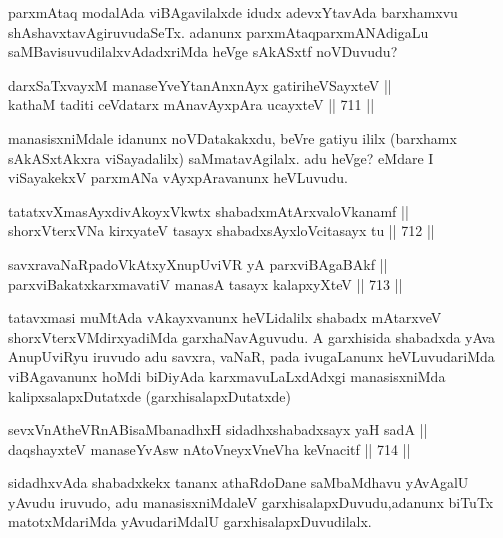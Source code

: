 \begin{artha} 
parxmAtaq modalAda viBAgavilalxde idudx adevxYtavAda barxhamxvu 
shAshavxtavAgiruvudaSeTx. adanunx parxmAtaqparxmANAdigaLu 
saMBavisuvudilalxvAdadxriMda heVge sAkASxtf noVDuvudu?
\end{artha}


\begin{shl}
darxSaTxvayxM manaseYveYtanAnxnAyx gatiriheVSayxteV || \\
kathaM taditi ceVdatarx mAnavAyxpAra ucayxteV \hfill || 711 ||  
\end{shl}

\begin{artha} 
manasisxniMdale idanunx noVDatakakxdu, beVre gatiyu ililx (barxhamx sAkASxtAkxra viSayadalilx) saMmatavAgilalx. adu heVge? eMdare I viSayakekxV parxmANa vAyxpAravanunx heVLuvudu.
\end{artha}

\begin{shl}
tatatxvXmasAyxdivAkoyxVkwtx shabadxmAtArxvaloVkanamf || \\
shorxVterxVNa kirxyateV tasayx shabadxsAyx\s \s loVcitasayx tu \hfill || 712 ||  
\end{shl}
				
\begin{shl}
savxravaNaRpadoVkAtxyX\s \s nupUviVR yA parxviBAgaBAkf || \\
parxviBakatxkarxmavatiV manasA tasayx kalapxyXteV \hfill || 713 ||  
\end{shl}

\begin{artha} 
tatavxmasi muMtAda vAkayxvanunx heVLidalilx shabadx mAtarxveV\break
shorxVterxVMdirxyadiMda garxhaNavAguvudu. A garxhisida shabadxda yAva 
AnupUviRyu iruvudo adu savxra, vaNaR, pada ivugaLanunx heVLuvudariMda 
viBAgavanunx hoMdi biDiyAda karxmavuLaLxdAdxgi manasisxniMda 
kalipxsalapxDutatxde (garxhisalapxDutatxde)
\end{artha}

\begin{shl}
sevxVnAtheVRnABisaMbanadhxH sidadhxshabadxsayx yaH sadA || \\
daqshayxteV manaseYvAsw nAtoV\s neyxVneVha keVnacitf \hfill || 714 ||  
\end{shl}

\begin{artha} 
sidadhxvAda shabadxkekx tananx athaRdoDane saMbaMdhavu yAvAgalU yAvudu 
iruvudo, adu manasisxniMdaleV garxhisalapxDuvudu,\break adanunx biTuTx 
matotxMdariMda yAvudariMdalU garxhisalapxDuvudilalx.
\end{artha}

